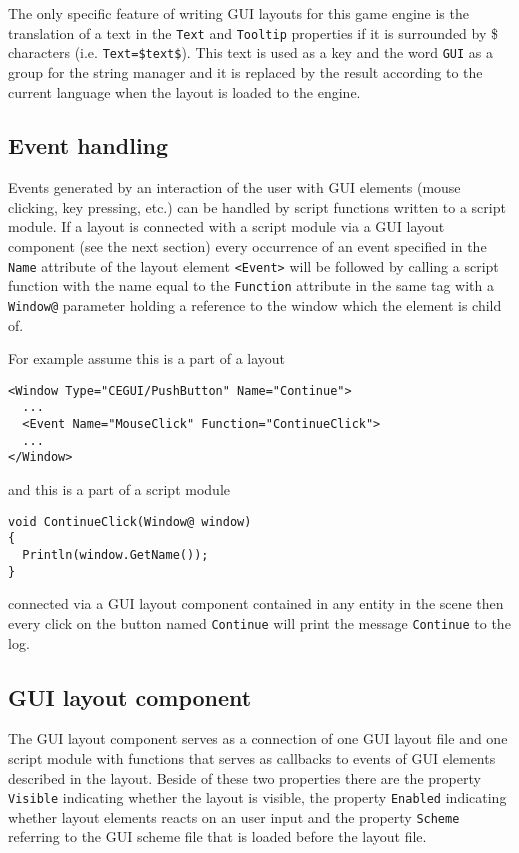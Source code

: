 The only specific feature of writing GUI layouts for this game engine is the translation of a text in the \verb/Text/ and \verb/Tooltip/ properties if it is surrounded by \$ characters (i.e. \verb/Text=$text$/). This text is used as a key and the word \verb/GUI/ as a group for the string manager and it is replaced by the result according to the current language when the layout is loaded to the engine.

\subsection{Event handling}
\label{sub:gui-event}

Events generated by an interaction of the user with GUI elements (mouse clicking, key pressing, etc.) can be handled by script functions written to a script module. If a layout is connected with a script module via a GUI layout component (see the next section) every occurrence of an event specified in the \verb/Name/ attribute of the layout element \verb/<Event>/ will be followed by calling a script function with the name equal to the \verb/Function/ attribute in the same tag with a \verb/Window@/ parameter holding a reference to the window which the element is child of.

For example assume this is a part of a layout

\begin{verbatim}
<Window Type="CEGUI/PushButton" Name="Continue">
  ...
  <Event Name="MouseClick" Function="ContinueClick">
  ...
</Window>
\end{verbatim}

\noindent and this is a part of a script module

\begin{verbatim}
void ContinueClick(Window@ window)
{
  Println(window.GetName());
}
\end{verbatim}

\noindent connected via a GUI layout component contained in any entity in the scene then every click on the button named \verb/Continue/ will print the message \verb/Continue/ to the log.

\subsection{GUI layout component}

The GUI layout component serves as a connection of one GUI layout file and one script module with functions that serves as callbacks to events of GUI elements described in the layout. Beside of these two properties there are the property \verb/Visible/ indicating whether the layout is visible, the property \verb/Enabled/ indicating whether layout elements reacts on an user input and the property \verb/Scheme/ referring to the GUI scheme file that is loaded before the layout file.

